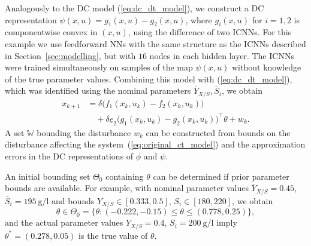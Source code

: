 \documentclass[final,5p,times,twocolumn,authoryear]{elsarticle}
\def\W{\mathbb{W}}
\begin{document}
Analogously to the DC model (\ref{eq:dc_dt_model}), we construct a DC representation $\psi(x,u) = g_1(x,u) - g_2(x,u)$, where $g_i(x,u)$ for $i=1,2$ is componentwise convex in $(x,u)$, using the difference of two ICNNs. For this example we use feedforward NNs with the same structure as the ICNNs described in Section~\ref{sec:modelling}, but with $16$ nodes in each hidden layer. 
The ICNNs were trained simultaneously on samples of the map $\psi(x,u)$ without knowledge of the true parameter values.
Combining this model with (\ref{eq:dc_dt_model}), which was identified using the nominal parameters $\bar{Y}_{X/S}, \bar{S}_i$, we obtain
\begin{align}\label{eq:linpar_dt_dc_model}
  x_{k+1} &= \delta \bigl( f_1(x_k,u_k) - f_2 (x_k, u_k)\bigr) \nonumber \\
  &\quad + \delta \underline{e}_2 \bigl( g_1(x_k,u_k) - g_2 (x_k, u_k)\bigr)^\top \theta + w_k . 
\end{align}
A set $\W$ bounding the disturbance $w_k$ can be constructed from bounds on the disturbance affecting the system~(\ref{eq:original_ct_model}) and the approximation errors in the DC representations of $\phi$ and $\psi$. 


%
%
An initial bounding set $\Theta_0$ containing $\theta$ can be determined if prior  parameter bounds are available. For example, with nominal parameter values $\bar{Y}_{X/S} = 0.45$, $\bar{S}_i = \SI{195}{\gram\per\litre}$ and bounds $Y_{X/S}\in [0.333,0.5]$, $S_i \in [180,220]$, we obtain
\[
\theta \in \Theta_0 = \{ \theta : ({-0.222}, {-0.15}) \leq  \theta \leq (0.778, 0.25) \},
\]
and the actual parameter values $Y_{X/S} = 0.4$, $S_i = \SI{200}{\gram\per\litre}$ imply $\theta^\ast = (0.278,0.05)$ is the true value of $\theta$.
\end{document}
